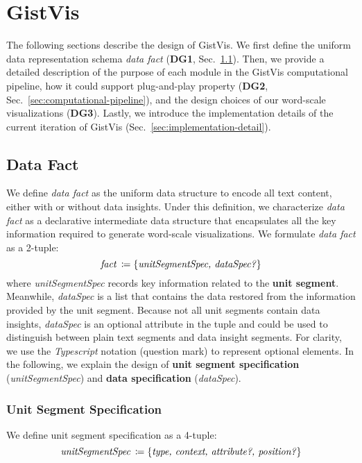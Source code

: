 \section{GistVis}
\label{sec:gistvis-method}
The following sections describe the design of GistVis. We first define the uniform data representation schema \textit{data fact} (\textbf{DG1}, Sec.~\ref{sec:gistvis-gistfact}). Then, we provide a detailed description of the purpose of each module in the GistVis computational pipeline, how it could support plug-and-play property (\textbf{DG2}, Sec.~\ref{sec:computational-pipeline}), and the design choices of our word-scale visualizations (\textbf{DG3}). Lastly, we introduce the implementation details of the current iteration of GistVis (Sec.~\ref{sec:implementation-detail}).

\subsection{Data Fact}
\label{sec:gistvis-gistfact}

We define \textit{data fact} as the uniform data structure to encode all text content, either with or without data insights. Under this definition, we characterize \textit{data fact} as a declarative intermediate data structure that encapsulates all the key information required to generate word-scale visualizations. We formulate \textit{data fact} as a 2-tuple:
\begin{equation}
\text{\textit{fact}}\, \coloneq \left \{ \text{\textit{unitSegmentSpec, dataSpec?}} \right \} \nonumber
\end{equation}
where \textit{unitSegmentSpec} records key information related to the \textbf{unit segment}. Meanwhile, \textit{dataSpec} is a list that contains the data restored from the information provided by the unit segment. Because not all unit segments contain data insights, \textit{dataSpec} is an optional attribute in the tuple and could be used to distinguish between plain text segments and data insight segments. For clarity, we use the \textit{Typescript} notation (question mark) to represent optional elements. In the following, we explain the design of \textbf{unit segment specification} (\textit{unitSegmentSpec}) and \textbf{data specification} (\textit{dataSpec}).

\subsubsection{Unit Segment Specification}
\label{sec:gistvis-unitSegmentSpec}
We define unit segment specification as a 4-tuple:
\begin{equation}
    \text{\textit{unitSegmentSpec}}\, \coloneq \left \{
        \text{\textit{type, context, attribute?, position?}}
    \right \} \nonumber
\end{equation}

